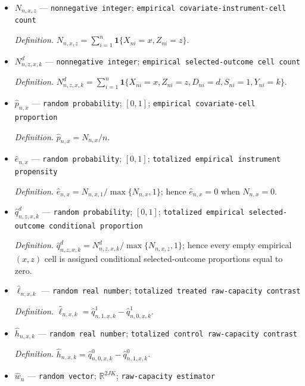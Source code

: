 \documentclass{article}
\begin{document}
\begin{itemize}
  \par\smallskip\noindent\emph{Definition.} \(N_{n,x}=\sum_{i=1}^n\mathbf 1\{X_{ni}=x\}\).
  \item \(N_{n,x,z}\) --- \texttt{nonnegative integer}; \texttt{empirical covariate-\allowbreak{}instrument-\allowbreak{}cell count}
  \par\smallskip\noindent\emph{Definition.} \(N_{n,x,z}=\sum_{i=1}^n\mathbf 1\{X_{ni}=x,Z_{ni}=z\}\).
  \item \(N^d_{n,z,x,k}\) --- \texttt{nonnegative integer}; \texttt{empirical selected-\allowbreak{}outcome cell count}
  \par\smallskip\noindent\emph{Definition.} \(N^d_{n,z,x,k}=\sum_{i=1}^n\mathbf 1\{X_{ni}=x,Z_{ni}=z,D_{ni}=d,S_{ni}=1,Y_{ni}=k\}\).
  \item \(\widehat p_{n,x}\) --- \texttt{random probability}; \([0,1]\); \texttt{empirical covariate-\allowbreak{}cell proportion}
  \par\smallskip\noindent\emph{Definition.} \(\widehat p_{n,x}=N_{n,x}/n\).
  \item \(\widehat e_{n,x}\) --- \texttt{random probability}; \([0,1]\); \texttt{totalized empirical instrument propensity}
  \par\smallskip\noindent\emph{Definition.} \(\widehat e_{n,x}=N_{n,x,1}/\max\{N_{n,x},1\}\); hence \(\widehat e_{n,x}=0\) when \(N_{n,x}=0\).
  \item \(\widehat q^d_{n,z,x,k}\) --- \texttt{random probability}; \([0,1]\); \texttt{totalized empirical selected-\allowbreak{}outcome conditional proportion}
  \par\smallskip\noindent\emph{Definition.} \(\widehat q^d_{n,z,x,k}=N^d_{n,z,x,k}/\max\{N_{n,x,z},1\}\); hence every empty empirical \((x,z)\) cell is assigned conditional selected-outcome proportions equal to zero.
  \item \(\widehat\ell_{n,x,k}\) --- \texttt{random real number}; \texttt{totalized treated raw-\allowbreak{}capacity contrast}
  \par\smallskip\noindent\emph{Definition.} \(\widehat\ell_{n,x,k}=\widehat q^1_{n,1,x,k}-\widehat q^1_{n,0,x,k}\).
  \item \(\widehat h_{n,x,k}\) --- \texttt{random real number}; \texttt{totalized control raw-\allowbreak{}capacity contrast}
  \par\smallskip\noindent\emph{Definition.} \(\widehat h_{n,x,k}=\widehat q^0_{n,0,x,k}-\widehat q^0_{n,1,x,k}\).
  \item \(\widehat w_n\) --- \texttt{random vector}; \(\mathbb R^{2JK}\); \texttt{raw-\allowbreak{}capacity estimator}

\end{itemize}
\end{document}
